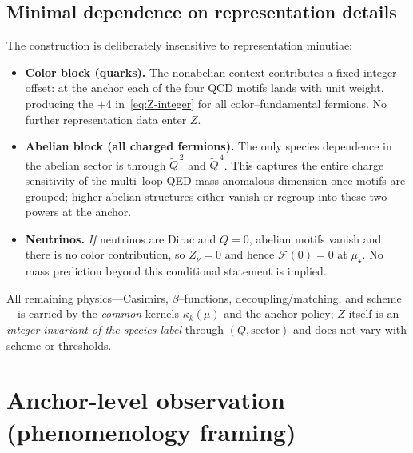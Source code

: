 \documentclass[epjc3]{svjour3}
\begin{document}
\subsection{Minimal dependence on representation details}\label{sec:minimal-rep}
The construction is deliberately insensitive to representation minutiae:
\begin{itemize}
  \item \textbf{Color block (quarks).} The nonabelian context contributes a fixed integer offset: at the anchor each of the four QCD motifs lands with unit weight, producing the $+4$ in~\eqref{eq:Z-integer} for all color--fundamental fermions. No further representation data enter $Z$. %
  \item \textbf{Abelian block (all charged fermions).} The only species dependence in the abelian sector is through $\tilde Q^{\,2}$ and $\tilde Q^{\,4}$. This captures the entire charge sensitivity of the multi--loop QED mass anomalous dimension once motifs are grouped; higher abelian structures either vanish or regroup into these two powers at the anchor. %
  \item \textbf{Neutrinos.} \emph{If} neutrinos are Dirac and $Q=0$, abelian motifs vanish and there is no color contribution, so $Z_\nu=0$ and hence $\mathcal F(0)=0$ at $\mu_\star$. No mass prediction beyond this conditional statement is implied. %
\end{itemize}
All remaining physics—Casimirs, $\beta$--functions, decoupling/matching, and scheme—is carried by the \emph{common} kernels $\kappa_k(\mu)$ and the anchor policy; $Z$ itself is an \emph{integer invariant of the species label} through $(Q,\text{sector})$ and does not vary with scheme or thresholds. %


\section{Anchor-level observation (phenomenology framing)}
\label{sec:main-anchor-identity}
\end{document}
